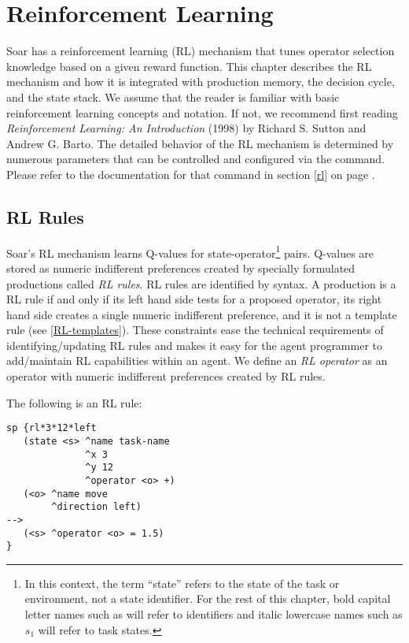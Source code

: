 \chapter{Reinforcement Learning}
\label{RL}

Soar has a reinforcement learning (RL) mechanism that tunes operator selection knowledge based on a given reward function.
This chapter describes the RL mechanism and how it is integrated with production memory, the decision cycle, and the state stack.
We assume that the reader is familiar with basic reinforcement learning concepts and notation. If not, we recommend first reading \emph{Reinforcement Learning: An Introduction} (1998) by Richard S. Sutton and Andrew G. Barto.
The detailed behavior of the RL mechanism is determined by numerous parameters that can be controlled and configured via the  command.
Please refer to the documentation for that command in section \ref{rl} on page \pageref{rl}.

\section{RL Rules}
\label{RL-rules}

Soar's RL mechanism learns Q-values for state-operator\footnote{
In this context, the term ``state'' refers to the state of the task or environment, not a state identifier.
For the rest of this chapter, bold capital letter names such as  will refer to identifiers and italic lowercase names such as $s_1$ will refer to task states.}
pairs.
Q-values are stored as numeric indifferent preferences created by specially formulated productions called \emph{RL rules}.
RL rules are identified by syntax.
A production is a RL rule if and only if its left hand side tests for a proposed operator, its right hand side creates a single numeric indifferent preference, and it is not a template rule (see \ref{RL-templates}).
These constraints ease the technical requirements of identifying/updating RL rules and makes it easy for the agent programmer to add/maintain RL capabilities within an agent.
We define an \emph{RL operator} as an operator with numeric indifferent preferences created by RL rules.

The following is an RL rule:

\begin{verbatim}
sp {rl*3*12*left
   (state <s> ^name task-name
              ^x 3
              ^y 12
	          ^operator <o> +)
   (<o> ^name move
	    ^direction left)
-->
   (<s> ^operator <o> = 1.5)
}
\end{verbatim}

